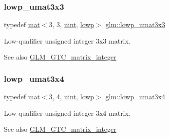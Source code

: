 \subsubsection{\texorpdfstring{lowp\+\_\+umat3x3}{lowp\_umat3x3}}
{\footnotesize\ttfamily typedef \hyperlink{structglm_1_1mat}{mat}$<$3, 3, \hyperlink{group__core__precision_ga4fd29415871152bfb5abd588334147c8}{uint}, \hyperlink{namespaceglm_a36ed105b07c7746804d7fdc7cc90ff25ae161af3fc695e696ce3bf69f7332bc2d}{lowp}$>$ \hyperlink{group__gtc__matrix__integer_ga267cf15202746fe0bd9b493ce2e98652}{glm\+::lowp\+\_\+umat3x3}}

Low-\/qualifier unsigned integer 3x3 matrix. \begin{DoxySeeAlso}{See also}
\hyperlink{group__gtc__matrix__integer}{G\+L\+M\+\_\+\+G\+T\+C\+\_\+matrix\+\_\+integer} 
\end{DoxySeeAlso}
\mbox{\label{group__gtc__matrix__integer_ga5a2dd2a09a6102f298973c41d4597c63}} 
\subsubsection{\texorpdfstring{lowp\+\_\+umat3x4}{lowp\_umat3x4}}
{\footnotesize\ttfamily typedef \hyperlink{structglm_1_1mat}{mat}$<$3, 4, \hyperlink{group__core__precision_ga4fd29415871152bfb5abd588334147c8}{uint}, \hyperlink{namespaceglm_a36ed105b07c7746804d7fdc7cc90ff25ae161af3fc695e696ce3bf69f7332bc2d}{lowp}$>$ \hyperlink{group__gtc__matrix__integer_ga5a2dd2a09a6102f298973c41d4597c63}{glm\+::lowp\+\_\+umat3x4}}

Low-\/qualifier unsigned integer 3x4 matrix. \begin{DoxySeeAlso}{See also}
\hyperlink{group__gtc__matrix__integer}{G\+L\+M\+\_\+\+G\+T\+C\+\_\+matrix\+\_\+integer} 
\end{DoxySeeAlso}
\mbox{\label{group__gtc__matrix__integer_ga41cc5d910308e4b471aa6543ce22dd20}} 
